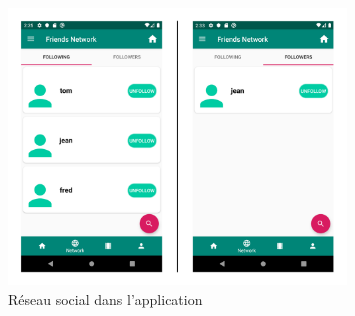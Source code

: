 \begin{figure}
    \begin{center}
        \includegraphics[width=0.8\textwidth]{img/screenshots/ViewPager2.png}
    \end{center}
    \caption{Réseau social dans l'application}
    \label{view_pager2}
\end{figure}

